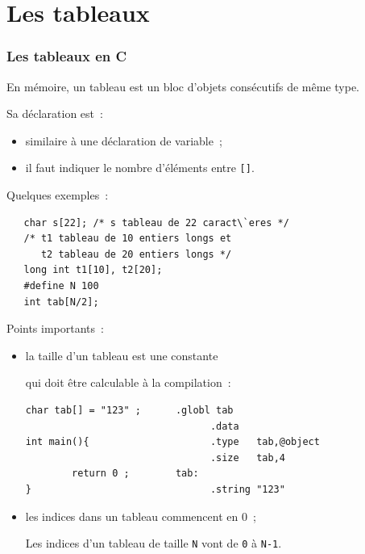 \section{Les tableaux}
\begin{frame}[fragile]
\frametitle{Les tableaux en C}
  En m\'emoire, un tableau est un bloc d'objets cons\'ecutifs de
  m\^eme type.
	\par\bigskip
  Sa d\'eclaration est~:
  \begin{itemize}
  \item similaire \`a une d\'eclaration de variable~;
  \item il faut indiquer le nombre d'\'el\'ements entre {\tt []}.
  \end{itemize}
	\par\bigskip
Quelques exemples~:
\begin{verbatim}
   char s[22]; /* s tableau de 22 caract\`eres */
   /* t1 tableau de 10 entiers longs et 
      t2 tableau de 20 entiers longs */
   long int t1[10], t2[20];
   #define N 100
   int tab[N/2];
\end{verbatim}
\end{frame}
\begin{frame}[fragile]
  Points importants~:
  \begin{itemize}
  \item la taille d'un tableau est une constante
    \begin{bf}
      qui doit \^etre calculable \`a la compilation~:
    \end{bf}
\begin{verbatim}
char tab[] = "123" ;      .globl tab                   
                                .data                
int main(){                     .type   tab,@object  
                                .size   tab,4        
        return 0 ;        tab:                         
}                               .string "123"        
\end{verbatim}
  \item les indices dans un tableau commencent en 0~;
    \par\medskip
  \begin{bf}
    Les indices d'un tableau de taille {\tt N} vont de {\tt 0} \`a
    {\tt N-1}.
    \end{bf}
  \end{itemize}
\end{frame}
